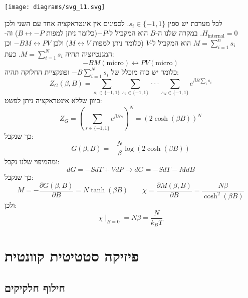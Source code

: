 \documentclass{tstextbook}
\begin{document}
\texttt{[image: diagrams/svg\_11.svg]}
\begin{example}
לכל מערכת יש ספין \(s_{i}\in \{ -1,1 \}\). לספינים אין אינטראקציה אחד עם השני ולכן \(H_{\text{internal}}=0\). במקרה שלנו ה-\(B\) הוא המקביל ל-\(-P\)(כלומר ניתן למפות \(B\leftrightarrow -P\)) וה-\(M=\sum_{i=1}^{n}s_{i}\) הוא המקביל ל-\(V\) (כלומר ניתן למפות \(M\leftrightarrow V\)) ולכן \(-BM\leftrightarrow PV\) וכן המגנטיזציה תהיה \(M=\sum_{i=1}^{N}s_{i}\). כעת:
$$-BM(\text{micro})\leftrightarrow  PV(\text{micro})$$
כלומר יש כוח מוכלל של \(-B\sum_{i=1}^{N}s_{i}\) ופונקציית החלוקה תהיה:
$$Z_{G}\left( \beta, B \right)=\sum_{s_{1}\in\{-1,1\}}\sum_{s_{2}\in\{-1,1\}}\cdot\cdot\cdot\sum_{s_{N}\in\{-1,1\}}e^{\beta B\sum_{i}s_{i}}$$
כיוון שללא אינטראקציה ניתן לפשט:
$$Z_{G}=\left(\sum_{s\in\{-1,1\}}e^{\beta B s}\right)^{N}=\left(2\cosh\left(\beta B\right)\right)^{N}$$
כך שנקבל:
$$G\left(\beta,B\right)=-\frac{N}{\beta}\log\left(2\cosh\left(\beta B\right)\right)$$
ומהמיפוי שלנו נקבל:
$$d G=-S d T+V d P\longrightarrow d G=-S d T-M d B$$
כך שנקבל:
$$M=-\frac{\partial G\left(\beta,B\right)}{\partial B}=N\operatorname{tanh}\left(\beta B\right)\qquad \chi=\frac{\partial M\left(\beta,B\right)}{\partial B}=\frac{N\beta}{\cosh^{2}\left(\beta B\right)}$$
ולכן:
$$\chi\mid_{B=0}=N\beta=\frac{N}{k_{B}T}$$

\end{example}
\chapter{פיזיקה סטטיטית קוונטית}

\section{חילוף חלקיקים}
\end{document}
